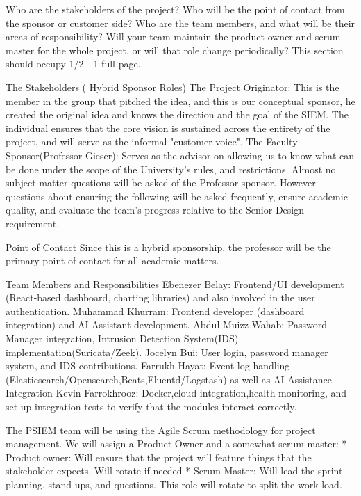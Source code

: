 Who are the stakeholders of the project? Who will be the point of contact from the sponsor or customer side? Who are the team members, and what will be their areas of responsibility? Will your team maintain the product owner and scrum master for the whole project, or will that role change periodically? This section should occupy 1/2 - 1 full page.

The Stakeholders ( Hybrid Sponsor Roles)
The Project Originator: This is the member in the group that pitched the idea, and this is our conceptual sponsor, he created the original idea and knows the direction and the goal of the SIEM. The individual ensures that the core vision is sustained across the entirety of the project, and will serve as the informal "customer voice".
The Faculty Sponsor(Professor Gieser): Serves as the advisor on allowing us to know what can be done under the scope of the University's rules, and restrictions. Almost no subject matter questions will be asked of the Professor sponsor. However questions about ensuring the following will be asked frequently, ensure academic quality, and evaluate the team's progress relative to the Senior Design requirement.

Point of Contact
Since this is a hybrid sponsorship, the professor will be the primary point of contact for all academic matters.

Team Members and Responsibilities
Ebenezer Belay: Frontend/UI development (React-based dashboard, charting libraries) and also involved in the user authentication.
Muhammad Khurram: Frontend developer (dashboard integration) and AI Assistant development.
Abdul Muizz Wahab: Password Manager integration, Intrusion Detection System(IDS) implementation(Suricata/Zeek).
Jocelyn Bui: User login, password manager system, and IDS contributions.
Farrukh Hayat: Event log handling (Elasticsearch/Opensearch,Beats,Fluentd/Logstash) as well as AI Assistance Integration
Kevin Farrokhrooz: Docker,cloud integration,health monitoring, and set up integration tests to verify that the modules interact correctly.

The PSIEM team will be using the Agile Scrum methodology for project management. We will assign a Product Owner and a somewhat scrum master:
* Product owner: Will ensure that the project will feature things that the stakeholder expects. Will rotate if needed
* Scrum Master: Will lead the sprint planning, stand-ups, and questions. This role will rotate to split the work load.




